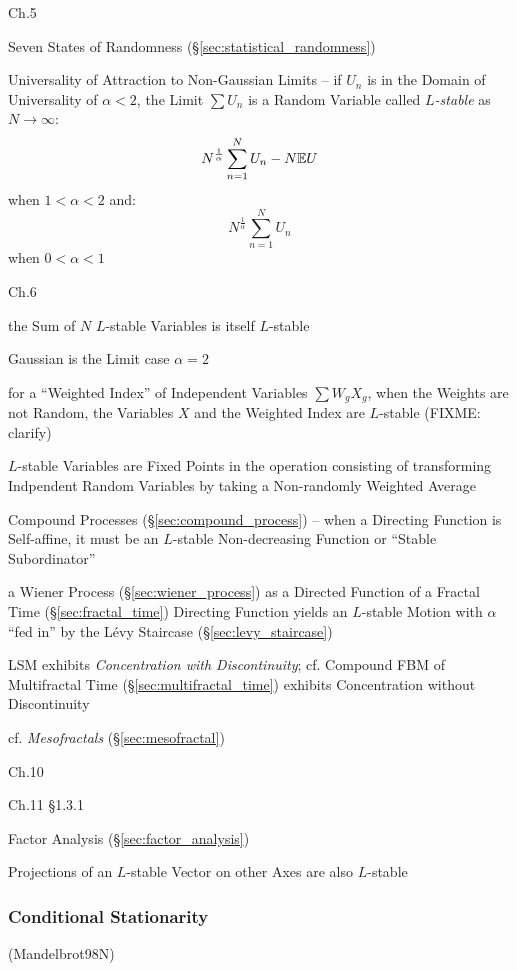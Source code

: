 Ch.5

\fist Seven States of Randomness (\S\ref{sec:statistical_randomness})

Universality of Attraction to Non-Gaussian Limits -- if $U_n$ is in the Domain
of Universality of $\alpha < 2$, the Limit $\sum U_n$ is a Random Variable
called \emph{$L$-stable} as $N \to \infty$:
\[
  N^\frac{1}{\alpha} \sum_{n=1}^N U_n - N \mathbb{E}{U}
\]
when $1 < \alpha < 2$ and:
\[
  N^\frac{1}{\alpha} \sum_{n=1}^N U_n
\]
when $0 < \alpha < 1$

Ch.6

the Sum of $N$ $L$-stable Variables is itself $L$-stable

Gaussian is the Limit case $\alpha = 2$

for a ``Weighted Index'' of Independent Variables $\sum W_g X_g$, when the
Weights are not Random, the Variables $X$ and the Weighted Index are $L$-stable
(FIXME: clarify)

$L$-stable Variables are Fixed Points in the operation consisting of
transforming Indpendent Random Variables by taking a Non-randomly Weighted
Average

Compound Processes (\S\ref{sec:compound_process}) -- when a Directing Function
is Self-affine, it must be an $L$-stable Non-decreasing Function or ``Stable
Subordinator''

a Wiener Process (\S\ref{sec:wiener_process}) as a Directed Function of a
Fractal Time (\S\ref{sec:fractal_time}) Directing Function yields an $L$-stable
Motion with $\alpha$ ``fed in'' by the L\'evy Staircase
(\S\ref{sec:levy_staircase})

LSM exhibits \emph{Concentration with Discontinuity}; cf. Compound FBM of
Multifractal Time (\S\ref{sec:multifractal_time}) exhibits Concentration without
Discontinuity

cf. \emph{Mesofractals} (\S\ref{sec:mesofractal})

Ch.10

Ch.11 \S 1.3.1

Factor Analysis (\S\ref{sec:factor_analysis})

Projections of an $L$-stable Vector on other Axes are also $L$-stable



\subsubsection{Conditional Stationarity}\label{sec:conditional_stationarity}

(Mandelbrot98N)


